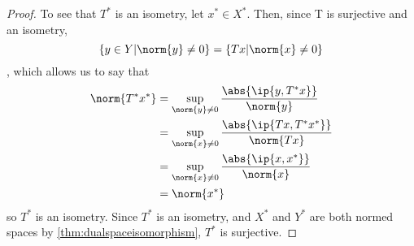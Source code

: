 \begin{prop}
\begin{proof}
    To see that $T^*$ is an isometry, 
    let $x^* \in X^*$. Then, 
    since T is surjective and an isometry, 
    \begin{equation*}
    \{y \in Y| \norm{y} \neq 0  \} = \{Tx | \norm{x} \neq 0\}
    \end{equation*}
    , which allows us to say that
    \begin{align*}
    \norm{T^*x^*} &= \sup\limits_{\norm{y} \neq 0} \frac{\abs{\ip{y, T^*x}}}{\norm{y}}\\
    &= \sup\limits_{\norm{x} \neq 0} \frac{\abs{\ip{Tx, T^*x^*}}}{\norm{Tx}} \\
    & = \sup\limits_{\norm{x} \neq 0} \frac{\abs{\ip{x,x^*}}}{\norm{x}}\\
    & = \norm{x^*}
    \end{align*}
    so $T^*$ is an isometry. 
    Since $T^*$ is an isometry, and 
    $X^*$ and $Y^*$ are both normed spaces by 
    \ref{thm:dualspaceisomorphism}, 
    $T^*$ is surjective. 

    \end{proof}



\end{prop}
